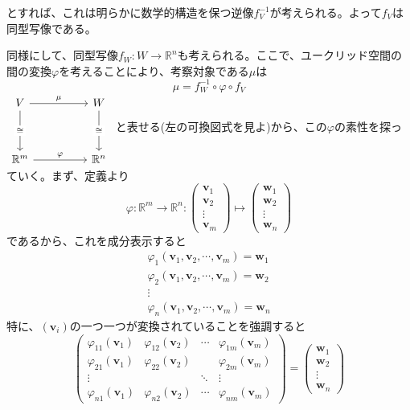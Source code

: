 \documentclass[dvipdfmx]{jsarticle}
\begin{document}
とすれば、これは明らかに数学的構造を保つ逆像$f_V^{-1}$が考えられる。よって$f_V$は同型写像である。\par
同様にして、同型写像$f_W:W\to\mathbb{R}^n$も考えられる。ここで、ユークリッド空間の間の変換$\varphi$を考えることにより、考察対象である$\mu$は
\[\mu=f_W^{-1} \circ \varphi \circ f_V\]
$\begin{tikzcd}
	V && W \\
	\\
	{\mathbb{R}^m} && {\mathbb{R}^n}
	\arrow["\mu", from=1-1, to=1-3]
	\arrow["\varphi", from=3-1, to=3-3]
	\arrow["\cong"{description}, from=1-1, to=3-1]
	\arrow["\cong"{description}, from=1-3, to=3-3]
\end{tikzcd}$
と表せる(左の可換図式を見よ)から、この$\varphi$の素性を探っていく。まず、定義より
\[\varphi:\mathbb{R}^m \to \mathbb{R}^n:\begin{pmatrix}\bm{v}_1\\\bm{v}_2\\\vdots\\\bm{v}_m\end{pmatrix}\mapsto\begin{pmatrix}\bm{w}_1\\\bm{w}_2\\\vdots\\\bm{w}_n\end{pmatrix}\]
であるから、これを成分表示すると
\[\begin{array}{ccc}\varphi_1(\bm{v}_1,\bm{v}_2,\cdots,\bm{v}_m)=\bm{w}_1\\\varphi_2(\bm{v}_1,\bm{v}_2,\cdots,\bm{v}_m)=\bm{w}_2\\\vdots\\\varphi_n(\bm{v}_1,\bm{v}_2,\cdots,\bm{v}_m)=\bm{w}_n\end{array}\]
特に、$(\bm{v}_i)$の一つ一つが変換されていることを強調すると
\[\begin{pmatrix}\varphi_{11}(\bm{v}_1)&\varphi_{12}(\bm{v}_2)&\cdots&\varphi_{1m}(\bm{v}_m)\\\varphi_{21}(\bm{v}_1)&\varphi_{22}(\bm{v}_2)&{}&\varphi_{2m}(\bm{v}_m)\\\vdots&{}&\ddots&\vdots\\\varphi_{n1}(\bm{v}_1)&\varphi_{n2}(\bm{v}_2)&\cdots&\varphi_{nm}(\bm{v}_m)\end{pmatrix}=\begin{pmatrix}\bm{w}_1\\\bm{w}_2\\\vdots\\\bm{w}_n\end{pmatrix}\]
\end{document}
